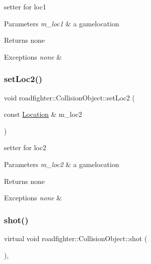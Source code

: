setter for loc1 
\begin{DoxyParams}{Parameters}
{\em m\+\_\+loc1} & a gamelocation \\
\hline
\end{DoxyParams}
\begin{DoxyReturn}{Returns}
none 
\end{DoxyReturn}

\begin{DoxyExceptions}{Exceptions}
{\em none} & \\
\hline
\end{DoxyExceptions}
\mbox{\label{classroadfighter_1_1CollisionObject_a8f566d1ea28f2ed16723572617abd583}} 
\subsubsection{\texorpdfstring{set\+Loc2()}{setLoc2()}}
{\footnotesize\ttfamily void roadfighter\+::\+Collision\+Object\+::set\+Loc2 (\begin{DoxyParamCaption}\item[{const \hyperlink{classroadfighter_1_1Location}{Location} \&}]{m\+\_\+loc2 }\end{DoxyParamCaption})}

setter for loc2 
\begin{DoxyParams}{Parameters}
{\em m\+\_\+loc2} & a gamelocation \\
\hline
\end{DoxyParams}
\begin{DoxyReturn}{Returns}
none 
\end{DoxyReturn}

\begin{DoxyExceptions}{Exceptions}
{\em none} & \\
\hline
\end{DoxyExceptions}
\mbox{\label{classroadfighter_1_1CollisionObject_a55d891b6d9b50abdc44f964a40a7777c}} 
\subsubsection{\texorpdfstring{shot()}{shot()}}
{\footnotesize\ttfamily virtual void roadfighter\+::\+Collision\+Object\+::shot (\begin{DoxyParamCaption}{ }\end{DoxyParamCaption})\hspace{0.3cm}{\ttfamily [inline]}, {\ttfamily [virtual]}}

